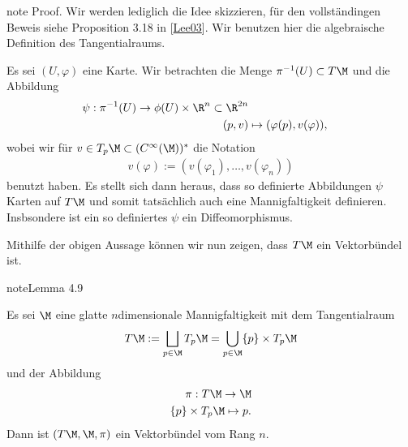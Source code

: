 \documentclass[letterpaper,10pt,english]{jupyterBook}
\begin{document}
\begin{sphinxadmonition}{note}
\sphinxAtStartPar
Proof. Wir werden lediglich die Idee skizzieren, für den vollständingen Beweis siehe Proposition 3.18 in {[}\hyperlink{cite.references:id15}{Lee03}{]}.
Wir benutzen hier die algebraische Definition des Tangentialraums.

\sphinxAtStartPar
Es sei \((U,\varphi)\) eine Karte.
Wir betrachten die Menge \(\pi^{-1}(U)\subset T\M\) und die Abbildung
\begin{equation*}
\begin{split}\psi:\pi^{-1}(U) \to \phi(U)\times \R^{n}\subset\R^{2n}\\
(p,v) &\mapsto (\varphi(p), v(\varphi)),\end{split}
\end{equation*}
\sphinxAtStartPar
wobei wir für \(v\in T_p\M\subset (C^\infty(\M))^\ast\) die Notation
\begin{equation*}
\begin{split}v(\varphi) := (v(\varphi_1),\ldots, v(\varphi_n))\end{split}
\end{equation*}
\sphinxAtStartPar
benutzt haben.
Es stellt sich dann heraus, dass so definierte Abbildungen \(\psi\) Karten auf \(T\M\) und somit tatsächlich auch eine Mannigfaltigkeit definieren.
Insbsondere ist ein so definiertes \(\psi\) ein Diffeomorphismus.
\end{sphinxadmonition}

\sphinxAtStartPar
Mithilfe der obigen Aussage können wir nun zeigen, dass \(T\M\) ein Vektorbündel ist.
\label{manifolds/tangential:lem:tanbundle}
\begin{sphinxadmonition}{note}{Lemma 4.9}



\sphinxAtStartPar
Es sei \(\M\) eine glatte \(n\)\sphinxhyphen{}dimensionale Mannigfaltigkeit mit dem Tangentialraum
\begin{equation*}
\begin{split}T\M:= \bigsqcup_{p\in\M}  T_p\M = \bigcup_{p\in\M} \{p\} \times T_p\M\end{split}
\end{equation*}
\sphinxAtStartPar
und der Abbildung
\begin{equation*}
\begin{split}\pi:T\M\to \M\\
\{p\}\times T_p\M\mapsto p.\end{split}
\end{equation*}
\sphinxAtStartPar
Dann ist \((T\M, \M, \pi)\) ein Vektorbündel vom Rang \(n\).
\end{sphinxadmonition}
\end{document}
